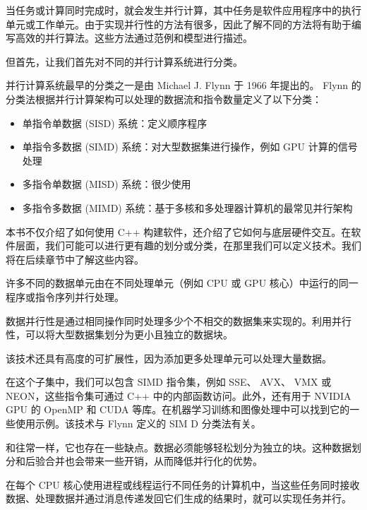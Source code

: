 当任务或计算同时完成时，就会发生并行计算，其中任务是软件应用程序中的执行单元或工作单元。由于实现并行性的方法有很多，因此了解不同的方法将有助于编写高效的并行算法。这些方法通过范例和模型进行描述。

但首先，让我们首先对不同的并行计算系统进行分类。


并行计算系统最早的分类之一是由 Michael J. Flynn 于 1966 年提出的。 Flynn 的分类法根据并行计算架构可以处理的数据流和指令数量定义了以下分类：

\begin{itemize}
\item
单指令单数据 (SISD) 系统：定义顺序程序

\item
单指令多数据 (SIMD) 系统：对大型数据集进行操作，例如 GPU 计算的信号处理

\item
多指令单数据 (MISD) 系统：很少使用

\item
多指令多数据 (MIMD) 系统：基于多核和多处理器计算机的最常见并行架构
\end{itemize}


本书不仅介绍了如何使用 C++ 构建软件，还介绍了它如何与底层硬件交互。在软件层面，我们可能可以进行更有趣的划分或分类，在那里我们可以定义技术。我们将在后续章节中了解这些内容。


许多不同的数据单元由在不同处理单元（例如 CPU 或 GPU 核心）中运行的同一程序或指令序列并行处理。

数据并行性是通过相同操作同时处理多少个不相交的数据集来实现的。利用并行性，可以将大型数据集划分为更小且独立的数据块。

该技术还具有高度的可扩展性，因为添加更多处理单元可以处理大量数据。

在这个子集中，我们可以包含 SIMD 指令集，例如 SSE、 AVX、 VMX 或 NEON，这些指令集可通过 C++ 中的内部函数访问。此外，还有用于 NVIDIA GPU 的 OpenMP 和 CUDA 等库。在机器学习训练和图像处理中可以找到它的一些使用示例。该技术与 Flynn 定义的 SIM D 分类法有关。

和往常一样，它也存在一些缺点。数据必须能够轻松划分为独立的块。这种数据划分和后验合并也会带来一些开销，从而降低并行化的优势。


在每个 CPU 核心使用进程或线程运行不同任务的计算机中，当这些任务同时接收数据、处理数据并通过消息传递发回它们生成的结果时，就可以实现任务并行。

